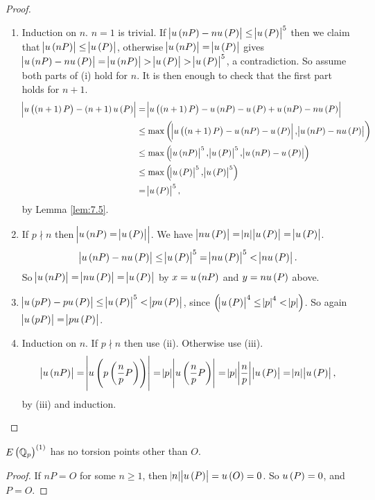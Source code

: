 \pagebreak

\begin{proof}
\hfill
\begin{enumerate}
\item Induction on $ n $. $ n = 1 $ is trivial. If $ \abs{u\br{nP} - nu\br{P}} \le \abs{u\br{P}}^5 $ then we claim that $ \abs{u\br{nP}} \le \abs{u\br{P}} $, otherwise $ \abs{u\br{nP}} = \abs{u\br{P}} $ gives $ \abs{u\br{nP} - nu\br{P}} = \abs{u\br{nP}} > \abs{u\br{P}} > \abs{u\br{P}}^5 $, a contradiction. So assume both parts of (i) hold for $ n $. It is then enough to check that the first part holds for $ n + 1 $.
\begin{align*}
\abs{u\br{\br{n + 1}P} - \br{n + 1}u\br{P}}
& = \abs{u\br{\br{n + 1}P} - u\br{nP} - u\br{P} + u\br{nP} - nu\br{P}} \\
& \le \max\br{\abs{u\br{\br{n + 1}P} - u\br{nP} - u\br{P}}, \abs{u\br{nP} - nu\br{P}}} \\
& \le \max\br{\abs{u\br{nP}}^5, \abs{u\br{P}}^5, \abs{u\br{nP} - u\br{P}}} \\
& \le \max\br{\abs{u\br{P}}^5, \abs{u\br{P}}^5} \\
& = \abs{u\br{P}}^5,
\end{align*}
by Lemma \ref{lem:7.5}.
\item If $ p \nmid n $ then $ \abs{u\br{nP} = \abs{u\br{P}}} $. We have $ \abs{nu\br{P}} = \abs{n}\abs{u\br{P}} = \abs{u\br{P}} $.
$$ \abs{u\br{nP} - nu\br{P}} \le \abs{u\br{P}}^5 = \abs{nu\br{P}}^5 < \abs{nu\br{P}}. $$
So $ \abs{u\br{nP}} = \abs{nu\br{P}} = \abs{u\br{P}} $ by $ x = u\br{nP} $ and $ y = nu\br{P} $ above.
\item $ \abs{u\br{pP} - pu\br{P}} \le \abs{u\br{P}}^5 < \abs{pu\br{P}} $, since $ \br{\abs{u\br{P}}^4 \le \abs{p}^4 < \abs{p}} $. So again $ \abs{u\br{pP}} = \abs{pu\br{P}} $.
\item Induction on $ n $. If $ p \nmid n $ then use (ii). Otherwise use (iii).
$$ \abs{u\br{nP}} = \abs{u\br{p\br{\dfrac{n}{p}P}}} = \abs{p}\abs{u\br{\dfrac{n}{p}P}} = \abs{p}\abs{\dfrac{n}{p}}\abs{u\br{P}} = \abs{n}\abs{u\br{P}}, $$
by (iii) and induction.
\end{enumerate}
\end{proof}

\begin{corollary}
\label{cor:7.7}
$ E\br{\Q_p}^{\br{1}} $ has no torsion points other than $ O $.
\end{corollary}

\begin{proof}
If $ nP = O $ for some $ n \ge 1 $, then $ \abs{n}\abs{u\br{P}} = u\br{O} = 0 $. So $ u\br{P} = 0 $, and $ P = O $.
\end{proof}

